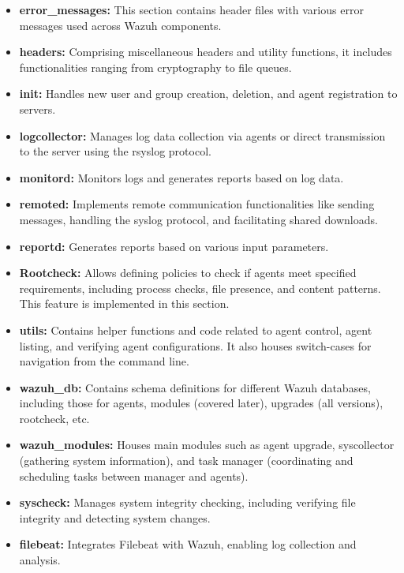 \begin{itemize}
    \item \textbf{error\_messages:} This section contains header files with various error messages used across Wazuh components.
    
    \item \textbf{headers:} Comprising miscellaneous headers and utility functions, it includes functionalities ranging from cryptography to file queues.
    
    \item \textbf{init:} Handles new user and group creation, deletion, and agent registration to servers.
    
    \item \textbf{logcollector:} Manages log data collection via agents or direct transmission to the server using the rsyslog protocol.
    
    \item \textbf{monitord:} Monitors logs and generates reports based on log data.
    
    \item \textbf{remoted:} Implements remote communication functionalities like sending messages, handling the syslog protocol, and facilitating shared downloads.
    
    \item \textbf{reportd:} Generates reports based on various input parameters.
    
    \item \textbf{Rootcheck:} Allows defining policies to check if agents meet specified requirements, including process checks, file presence, and content patterns. This feature is implemented in this section.
    
    \item \textbf{utils:} Contains helper functions and code related to agent control, agent listing, and verifying agent configurations. It also houses switch-cases for navigation from the command line.
    
    \item \textbf{wazuh\_db:} Contains schema definitions for different Wazuh databases, including those for agents, modules (covered later), upgrades (all versions), rootcheck, etc.
    
    \item \textbf{wazuh\_modules:} Houses main modules such as agent upgrade, syscollector (gathering system information), and task manager (coordinating and scheduling tasks between manager and agents).
    
    \item \textbf{syscheck:} Manages system integrity checking, including verifying file integrity and detecting system changes.
    
    \item \textbf{filebeat:} Integrates Filebeat with Wazuh, enabling log collection and analysis.
\end{itemize}

